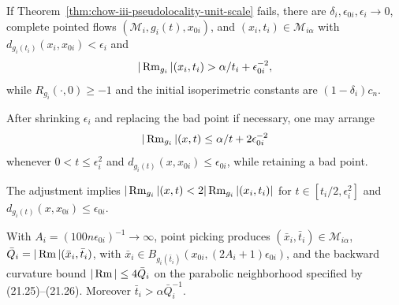 \begin{theorem}
\label{ctr:chow-iii-pseudolocality-counterstatement}


If Theorem~\ref{thm:chow-iii-pseudolocality-unit-scale} fails, there are
\(\delta_i,\epsilon_{0i},\epsilon_i\to0\), complete pointed flows
\((\mathcal M_i,g_i(t),x_{0i})\), and \((x_i,t_i)\in\mathcal M_{i\alpha}\) with
\(d_{g_i(t_i)}(x_i,x_{0i})<\epsilon_i\) and
\[
|\operatorname{Rm}_{g_i}|(x_i,t_i)>\alpha/t_i+\epsilon_{0i}^{-2},
\]
while \(R_{g_i}(\cdot,0)\ge-1\) and the initial isoperimetric constants are
\((1-\delta_i)c_n\).
\end{theorem}

\begin{lemma}
\label{lem:chow-iii-adjusted-bad-sequence}


After shrinking \(\epsilon_i\) and replacing the bad point if necessary, one
may arrange
\[
|\operatorname{Rm}_{g_i}|(x,t)\le\alpha/t+2\epsilon_{0i}^{-2}
\]
whenever \(0<t\le\epsilon_i^2\) and
\(d_{g_i(t)}(x,x_{0i})\le\epsilon_{0i}\), while retaining a bad point.
\end{lemma}

\begin{remark}
\label{rem:chow-iii-adjusted-local-bound}


The adjustment implies \(|\operatorname{Rm}_{g_i}|(x,t)<2|\operatorname{Rm}_{g_i}|(x_i,t_i)|\) for
\(t\in[t_i/2,\epsilon_i^2]\) and
\(d_{g_i(t)}(x,x_{0i})\le\epsilon_{0i}\).
\end{remark}

\begin{lemma}
\label{lem:chow-iii-well-chosen-points}


With \(A_i=(100n\epsilon_{0i})^{-1}\to\infty\), point picking produces
\((\bar x_i,\bar t_i)\in\mathcal M_{i\alpha}\),
\(\bar Q_i=|\operatorname{Rm}|(\bar x_i,\bar t_i)\), with
\(\bar x_i\in B_{g_i(\bar t_i)}(x_{0i},(2A_i+1)\epsilon_{0i})\), and the
backward curvature bound \(|\operatorname{Rm}|\le4\bar Q_i\) on the parabolic neighborhood
specified by (21.25)--(21.26).  Moreover \(\bar t_i>\alpha\bar Q_i^{-1}\).
\end{lemma}

